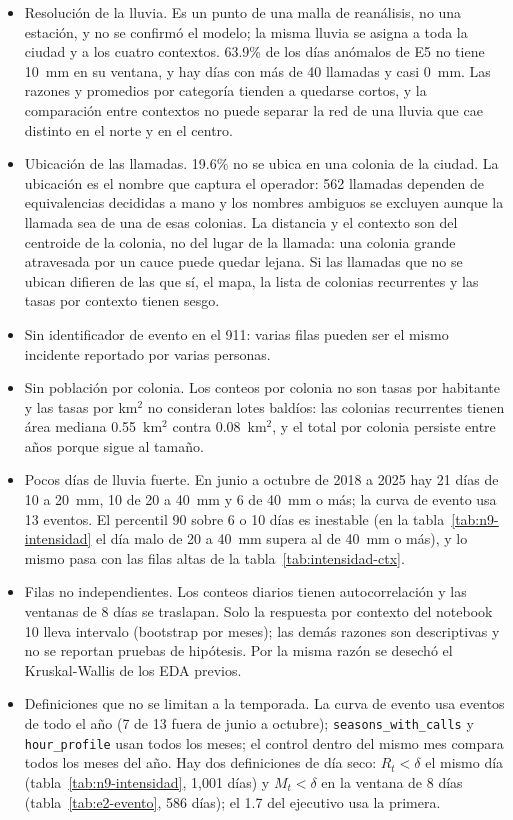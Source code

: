 \documentclass[11pt]{article}
\newcommand{\cod}[1]{\nolinkurl{#1}}
\begin{document}
\begin{itemize}
  \item Resolución de la lluvia. Es un punto de una malla de reanálisis, no una estación, y no se confirmó el modelo; la misma lluvia se asigna a toda la ciudad y a los cuatro contextos. 63.9\% de los días anómalos de E5 no tiene 10~mm en su ventana, y hay días con más de 40 llamadas y casi 0~mm. Las razones y promedios por categoría tienden a quedarse cortos, y la comparación entre contextos no puede separar la red de una lluvia que cae distinto en el norte y en el centro.
  \item Ubicación de las llamadas. 19.6\% no se ubica en una colonia de la ciudad. La ubicación es el nombre que captura el operador: 562 llamadas dependen de equivalencias decididas a mano y los nombres ambiguos se excluyen aunque la llamada sea de una de esas colonias. La distancia y el contexto son del centroide de la colonia, no del lugar de la llamada: una colonia grande atravesada por un cauce puede quedar lejana. Si las llamadas que no se ubican difieren de las que sí, el mapa, la lista de colonias recurrentes y las tasas por contexto tienen sesgo.
  \item Sin identificador de evento en el 911: varias filas pueden ser el mismo incidente reportado por varias personas.
  \item Sin población por colonia. Los conteos por colonia no son tasas por habitante y las tasas por km$^2$ no consideran lotes baldíos: las colonias recurrentes tienen área mediana 0.55~km$^2$ contra 0.08~km$^2$, y el total por colonia persiste entre años porque sigue al tamaño.
  \item Pocos días de lluvia fuerte. En junio a octubre de 2018 a 2025 hay 21 días de 10 a 20~mm, 10 de 20 a 40~mm y 6 de 40~mm o más; la curva de evento usa 13 eventos. El percentil 90 sobre 6 o 10 días es inestable (en la tabla~\ref{tab:n9-intensidad} el día malo de 20 a 40~mm supera al de 40~mm o más), y lo mismo pasa con las filas altas de la tabla~\ref{tab:intensidad-ctx}.
  \item Filas no independientes. Los conteos diarios tienen autocorrelación y las ventanas de 8 días se traslapan. Solo la respuesta por contexto del notebook 10 lleva intervalo (bootstrap por meses); las demás razones son descriptivas y no se reportan pruebas de hipótesis. Por la misma razón se desechó el Kruskal-Wallis de los EDA previos.
  \item Definiciones que no se limitan a la temporada. La curva de evento usa eventos de todo el año (7 de 13 fuera de junio a octubre); \cod{seasons_with_calls} y \cod{hour_profile} usan todos los meses; el control dentro del mismo mes compara todos los meses del año. Hay dos definiciones de día seco: $R_t<\delta$ el mismo día (tabla~\ref{tab:n9-intensidad}, 1,001 días) y $M_t<\delta$ en la ventana de 8 días (tabla~\ref{tab:e2-evento}, 586 días); el 1.7 del ejecutivo usa la primera.

\end{itemize}
\end{document}
